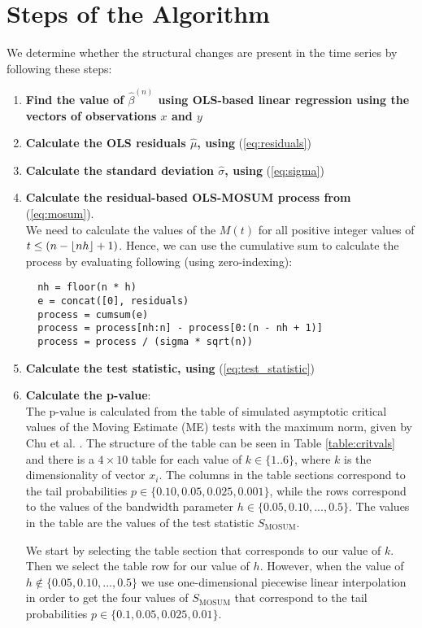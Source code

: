 \documentclass[main.tex]{subfiles}
\begin{document}
\section{Steps of the Algorithm}
We determine whether the structural changes are present in the time series by following these steps:
\label{sec:the_algorithm_steps}
\begin{enumerate}
\item \textbf{Find the value of $\hat{\beta}^{(n)}$ using OLS-based linear
  regression using the vectors of observations $x$ and $y$}
\item \textbf{Calculate the OLS residuals $\hat{\mu}$, using} (\ref{eq:residuals})
\item \textbf{Calculate the standard deviation $\hat{\sigma}$, using} (\ref{eq:sigma})
\item \textbf{Calculate the residual-based OLS-MOSUM process from} (\ref{eq:mosum}). \\
  We need to calculate the values of the $M(t)$ for all positive integer values of
  $t \leq (n - \lfloor nh\rfloor + 1)$. Hence, we can use the cumulative sum to
  calculate the process by evaluating following
  (using zero-indexing):
  \begin{verbatim}
  nh = floor(n * h)
  e = concat([0], residuals)
  process = cumsum(e)
  process = process[nh:n] - process[0:(n - nh + 1)]
  process = process / (sigma * sqrt(n))
  \end{verbatim}
\item \textbf{Calculate the test statistic, using} (\ref{eq:test_statistic})
\item \textbf{Calculate the p-value}:\\
  The p-value is calculated from the table of
  simulated asymptotic critical values of the Moving Estimate (ME) tests with
  the maximum norm, given by Chu et al. \cite{moving_estimate_test}. The structure of the table can
  be seen in Table \ref{table:critvals} and there is a $4 \times 10$ table for
  each value of $k \in \{1..6\}$, where $k$ is the dimensionality of
  vector $x_i$. The columns in the table sections correspond to the
  tail probabilities $p \in \{0.10, 0.05, 0.025, 0.001\}$, while the rows
  correspond to the values of the bandwidth parameter
  $h \in \{0.05, 0.10, ..., 0.5\}$. The values in the table are the values of
  the test statistic $S_{\text{MOSUM}}$.

  We start by selecting the table section that corresponds to our value of
  $k$. Then we select the table row for our value of $h$.
  However, when the value of $h \notin \{0.05, 0.10, ..., 0.5\}$
  we use one-dimensional piecewise linear interpolation in order to get the four
  values of $S_{\text{MOSUM}}$ that correspond to the tail probabilities 
  $p \in \{0.1, 0.05, 0.025, 0.01\}$. 


\end{enumerate}
\end{document}
